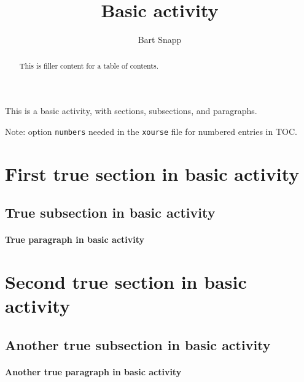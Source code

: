 \documentclass{ximera}
\author{Bart Snapp}
\title{Basic activity}
\begin{document}
\begin{abstract}
    This is filler content for a table of contents.
\end{abstract}
\maketitle

This is a basic activity, with sections, subsections, and paragraphs.

Note: option \verb!numbers! needed in the \verb!xourse! file for numbered entries in TOC.

\section{First true section in basic activity}
\lipsum[1][1-2]

\subsection{True subsection in basic activity}
\lipsum[2][1-2]

\paragraph{True paragraph in basic activity}
\lipsum[3][1]


\section{Second true section in basic activity}
\lipsum[4][1-2]

\subsection{Another true subsection in basic activity}
\lipsum[1][1-2]

\paragraph{Another true paragraph in basic activity}
\lipsum[2][1]
\end{document}
